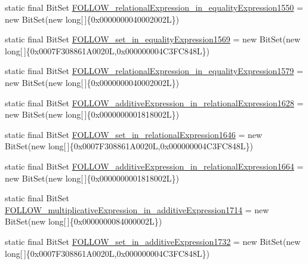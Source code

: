 \begin{DoxyCompactItemize}
\item 
static final Bit\-Set \hyperlink{classorg_1_1tzi_1_1use_1_1parser_1_1shell_1_1_shell_command_parser_a1fcda8009f9484871c1c17856727b620}{F\-O\-L\-L\-O\-W\-\_\-relational\-Expression\-\_\-in\-\_\-equality\-Expression1550} = new Bit\-Set(new long\mbox{[}$\,$\mbox{]}\{0x0000000040002002\-L\})
\item 
static final Bit\-Set \hyperlink{classorg_1_1tzi_1_1use_1_1parser_1_1shell_1_1_shell_command_parser_a5cbe77a102a5a0906f3a58a6cf5aebe9}{F\-O\-L\-L\-O\-W\-\_\-set\-\_\-in\-\_\-equality\-Expression1569} = new Bit\-Set(new long\mbox{[}$\,$\mbox{]}\{0x0007\-F308861\-A0020\-L,0x000000004\-C3\-F\-C848\-L\})
\item 
static final Bit\-Set \hyperlink{classorg_1_1tzi_1_1use_1_1parser_1_1shell_1_1_shell_command_parser_adb892e8c5cf5f6ea4085174eb86e994b}{F\-O\-L\-L\-O\-W\-\_\-relational\-Expression\-\_\-in\-\_\-equality\-Expression1579} = new Bit\-Set(new long\mbox{[}$\,$\mbox{]}\{0x0000000040002002\-L\})
\item 
static final Bit\-Set \hyperlink{classorg_1_1tzi_1_1use_1_1parser_1_1shell_1_1_shell_command_parser_adc7dbbb3ec4ee88116075f21dc86f900}{F\-O\-L\-L\-O\-W\-\_\-additive\-Expression\-\_\-in\-\_\-relational\-Expression1628} = new Bit\-Set(new long\mbox{[}$\,$\mbox{]}\{0x0000000001818002\-L\})
\item 
static final Bit\-Set \hyperlink{classorg_1_1tzi_1_1use_1_1parser_1_1shell_1_1_shell_command_parser_a9b71db836dc3e86975a1eafb5e437fe9}{F\-O\-L\-L\-O\-W\-\_\-set\-\_\-in\-\_\-relational\-Expression1646} = new Bit\-Set(new long\mbox{[}$\,$\mbox{]}\{0x0007\-F308861\-A0020\-L,0x000000004\-C3\-F\-C848\-L\})
\item 
static final Bit\-Set \hyperlink{classorg_1_1tzi_1_1use_1_1parser_1_1shell_1_1_shell_command_parser_a8f7406672fceebcd8419f28eabf20017}{F\-O\-L\-L\-O\-W\-\_\-additive\-Expression\-\_\-in\-\_\-relational\-Expression1664} = new Bit\-Set(new long\mbox{[}$\,$\mbox{]}\{0x0000000001818002\-L\})
\item 
static final Bit\-Set \hyperlink{classorg_1_1tzi_1_1use_1_1parser_1_1shell_1_1_shell_command_parser_ab5f9d68af38af8f852a25c090879f92d}{F\-O\-L\-L\-O\-W\-\_\-multiplicative\-Expression\-\_\-in\-\_\-additive\-Expression1714} = new Bit\-Set(new long\mbox{[}$\,$\mbox{]}\{0x0000000084000002\-L\})
\item 
static final Bit\-Set \hyperlink{classorg_1_1tzi_1_1use_1_1parser_1_1shell_1_1_shell_command_parser_ad806e87072d85f7cb9ccc8172e11f198}{F\-O\-L\-L\-O\-W\-\_\-set\-\_\-in\-\_\-additive\-Expression1732} = new Bit\-Set(new long\mbox{[}$\,$\mbox{]}\{0x0007\-F308861\-A0020\-L,0x000000004\-C3\-F\-C848\-L\})

\end{DoxyCompactItemize}
